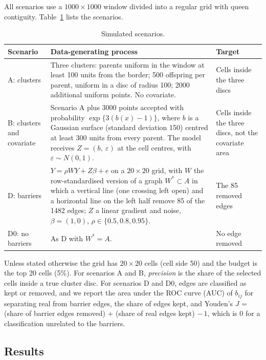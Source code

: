 All scenarios use a $1000\times1000$ window divided into a regular grid with queen contiguity. Table~\ref{tab:app-scenarios} lists the scenarios.

\begin{table}[ht]
\centering
\caption{Simulated scenarios.}
\label{tab:app-scenarios}
\begin{tabular}{p{}p{}p{}}
\hline
Scenario & Data-generating process & Target \\
\hline
A: clusters & Three clusters: parents uniform in the window at least 100 units from the border; 500 offspring per parent, uniform in a disc of radius 100; 2000 additional uniform points. No covariate. & Cells inside the three discs \\
B: clusters and covariate & Scenario A plus 3000 points accepted with probability $\exp\{3(b(x)-1)\}$, where $b$ is a Gaussian surface (standard deviation 150) centred at least 300 units from every parent. The model receives $Z=(b,\ \varepsilon)$ at the cell centres, with $\varepsilon\sim N(0,1)$. & Cells inside the three discs, not the covariate area \\
D: barriers & $Y=\rho W Y + Z\beta + e$ on a $20\times20$ grid, with $W$ the row-standardised version of a graph $W^\ast\subset A$ in which a vertical line (one crossing left open) and a horizontal line on the left half remove 85 of the 1482 edges; $Z$ a linear gradient and noise, $\beta=(1,0)$, $\rho\in\{0.5,0.8,0.95\}$. & The 85 removed edges \\
D0: no barriers & As D with $W^\ast=A$. & No edge removed \\
\hline
\end{tabular}
\end{table}

Unless stated otherwise the grid has $20\times20$ cells (cell side 50) and the budget is the top 20 cells (5\%). For scenarios A and B, \emph{precision} is the share of the selected cells inside a true cluster disc. For scenarios D and D0, edges are classified as kept or removed, and we report the area under the ROC curve (AUC) of $b_{ij}$ for separating real from barrier edges, the share of edges kept, and Youden's $J$ = (share of barrier edges removed) + (share of real edges kept) $-\,1$, which is 0 for a classification unrelated to the barriers.

\subsection{Results}
\label{app:rec-results}

